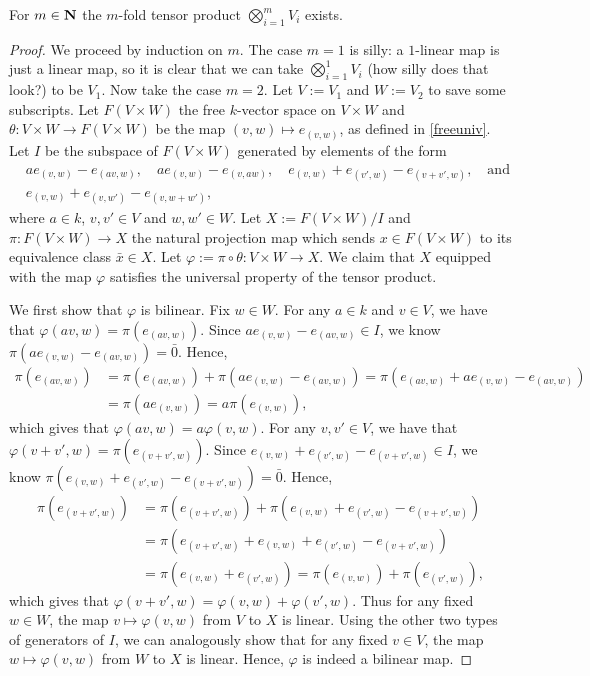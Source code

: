 \begin{pro}
  For $m \in \boldsymbol{\mathbf{N}}$ the $m$-fold tensor product $\bigotimes_{i=1}^m V_i$
  exists.
  \begin{proof}
    We proceed by induction on $m$. The case $m = 1$ is silly: a
    $1$-linear map is just a linear map, so it is clear that we can
    take $\bigotimes_{i=1}^1 V_i$ (how silly does that look?) to be
    $V_1$. Now take the case $m = 2$. Let $V:=V_1$ and $W:=V_2$ to
    save some subscripts. Let $F(V \times W)$ the free $k$-vector
    space on $V \times W$ and $\theta : V \times W \to F(V \times W)$
    be the map $(v,w) \mapsto e_{(v,w)}$, as defined in
    \ref{freeuniv}. Let $I$ be the subspace of $F(V \times W)$
    generated by elements of the form
    \begin{align*}
      &ae_{(v,w)} - e_{(av,w)},\quad ae_{(v,w)} - e_{(v,aw)},\quad
      e_{(v,w)} + e_{(v',w)} - e_{(v+v',w)},\quad \text{and}\\
      &e_{(v,w)} + e_{(v,w')} - e_{(v,w+w')},
    \end{align*}
    where $a \in k$, $v,v' \in V$ and $w,w' \in W$. Let $X := F(V
    \times W)\big/I$ and $\pi : F(V \times W) \to X$ the natural
    projection map which sends $x \in F(V \times W)$ to its
    equivalence class $\bar x \in X$. Let $\varphi := \pi \circ \theta
    : V \times W \to X$. We claim that $X$ equipped with the map
    $\varphi$ satisfies the universal property of the tensor product.

    We first show that $\varphi$ is bilinear. Fix $w \in W$. For any
    $a \in k$ and $v \in V$, we have that $\varphi(av,w) =
    \pi(e_{(av,w)})$. Since $ae_{(v,w)} - e_{(av,w)} \in I$, we know
    $\pi(ae_{(v,w)} - e_{(av,w)}) = \bar 0$. Hence,
    \begin{align*}
      \pi(e_{(av,w)}) &= \pi(e_{(av,w)})+\pi(ae_{(v,w)} - e_{(av,w)})
      = \pi(e_{(av,w)} + ae_{(v,w)} - e_{(av,w)}) \\ &=
      \pi(ae_{(v,w)}) = a\pi(e_{(v,w)}),
    \end{align*}
    which gives that $\varphi(av,w) = a\varphi(v,w)$. For any $v,v'
    \in V$, we have that $\varphi(v+v',w) = \pi(e_{(v+v',w)})$. Since
    $e_{(v,w)} + e_{(v',w)} - e_{(v+v',w)} \in I$, we know
    $\pi(e_{(v,w)} + e_{(v',w)} - e_{(v+v',w)}) = \bar 0$. Hence,
    \begin{align*}
      \pi(e_{(v+v',w)}) &= \pi(e_{(v+v',w)}) + \pi(e_{(v,w)} +
      e_{(v',w)} - e_{(v+v',w)}) \\ &= \pi(e_{(v+v',w)} + e_{(v,w)} +
      e_{(v',w)} - e_{(v+v',w)}) \\ &= \pi(e_{(v,w)} + e_{(v',w)}) =
      \pi(e_{(v,w)}) + \pi(e_{(v',w)}),
    \end{align*}
    which gives that $\varphi(v+v',w) = \varphi(v,w) +
    \varphi(v',w)$. Thus for any fixed $w \in W$, the map $v \mapsto
    \varphi(v,w)$ from $V$ to $X$ is linear. Using the other two types
    of generators of $I$, we can analogously show that for any fixed
    $v \in V$, the map $w \mapsto \varphi(v,w)$ from $W$ to $X$ is
    linear. Hence, $\varphi$ is indeed a bilinear map.


\end{proof}
\end{pro}
